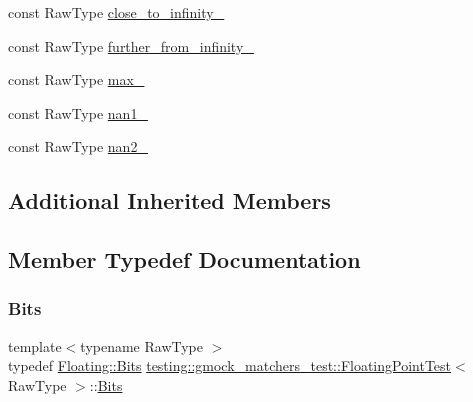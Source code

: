 \begin{DoxyCompactItemize}
const Raw\+Type \hyperlink{classtesting_1_1gmock__matchers__test_1_1_floating_point_test_a6fc8ac2030f4883e1c84da3a21bbb7c3}{close\+\_\+to\+\_\+infinity\+\_\+}
\item 
const Raw\+Type \hyperlink{classtesting_1_1gmock__matchers__test_1_1_floating_point_test_a603ab51280ecb1c4147c2660a7a90728}{further\+\_\+from\+\_\+infinity\+\_\+}
\item 
const Raw\+Type \hyperlink{classtesting_1_1gmock__matchers__test_1_1_floating_point_test_a17b9dd56136b64fa7210bfe024d88c30}{max\+\_\+}
\item 
const Raw\+Type \hyperlink{classtesting_1_1gmock__matchers__test_1_1_floating_point_test_a0d2544956414eac21d4519fe600e4603}{nan1\+\_\+}
\item 
const Raw\+Type \hyperlink{classtesting_1_1gmock__matchers__test_1_1_floating_point_test_a4af3b3e53a06d271479ff30f5d5ee155}{nan2\+\_\+}
\end{DoxyCompactItemize}
\subsection*{Additional Inherited Members}


\subsection{Member Typedef Documentation}
\mbox{\label{classtesting_1_1gmock__matchers__test_1_1_floating_point_test_addf899bd832ae51103198d201d2f2ea2}} 
\subsubsection{\texorpdfstring{Bits}{Bits}}
{\footnotesize\ttfamily template$<$typename Raw\+Type $>$ \\
typedef \hyperlink{classtesting_1_1internal_1_1_floating_point_abf228bf6cd48f12c8b44c85b4971a731}{Floating\+::\+Bits} \hyperlink{classtesting_1_1gmock__matchers__test_1_1_floating_point_test}{testing\+::gmock\+\_\+matchers\+\_\+test\+::\+Floating\+Point\+Test}$<$ Raw\+Type $>$\+::\hyperlink{classtesting_1_1gmock__matchers__test_1_1_floating_point_test_addf899bd832ae51103198d201d2f2ea2}{Bits}\hspace{0.3cm}{\ttfamily [protected]}}


